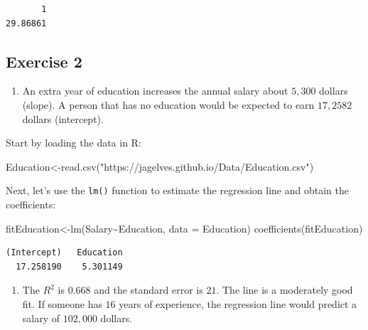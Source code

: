 \documentclass[
  letterpaper,
  DIV=11,
  numbers=noendperiod]{scrreprt}
\newenvironment{Shaded}{\begin{snugshade}}{\end{snugshade}}
\newcommand{\AttributeTok}[1]{\textcolor[rgb]{0.40,0.45,0.13}{#1}}
\newcommand{\FunctionTok}[1]{\textcolor[rgb]{0.28,0.35,0.67}{#1}}
\newcommand{\NormalTok}[1]{\textcolor[rgb]{0.00,0.23,0.31}{#1}}
\newcommand{\OtherTok}[1]{\textcolor[rgb]{0.00,0.23,0.31}{#1}}
\newcommand{\SpecialCharTok}[1]{\textcolor[rgb]{0.37,0.37,0.37}{#1}}
\newcommand{\StringTok}[1]{\textcolor[rgb]{0.13,0.47,0.30}{#1}}
\providecommand{\tightlist}{%
  \setlength{\itemsep}{0pt}\setlength{\parskip}{0pt}}\usepackage{longtable,booktabs,array}
\begin{document}
\begin{verbatim}
       1 
29.86861 
\end{verbatim}

\hypertarget{exercise-2-13}{%
\subsection*{Exercise 2}\label{exercise-2-13}}

\begin{enumerate}
\def\labelenumi{\arabic{enumi}.}
\tightlist
\item
  An extra year of education increases the annual salary about \(5,300\)
  dollars (slope). A person that has no education would be expected to
  earn \(17,2582\) dollars (intercept).
\end{enumerate}

Start by loading the data in R:

\begin{Shaded}
\begin{Highlighting}[numbers=left,,]
\NormalTok{Education}\OtherTok{\textless{}{-}}\FunctionTok{read.csv}\NormalTok{(}\StringTok{"https://jagelves.github.io/Data/Education.csv"}\NormalTok{)}
\end{Highlighting}
\end{Shaded}

Next, let's use the \texttt{lm()} function to estimate the regression
line and obtain the coefficients:

\begin{Shaded}
\begin{Highlighting}[numbers=left,,]
\NormalTok{fitEducation}\OtherTok{\textless{}{-}}\FunctionTok{lm}\NormalTok{(Salary}\SpecialCharTok{\textasciitilde{}}\NormalTok{Education, }\AttributeTok{data =}\NormalTok{ Education)}
\FunctionTok{coefficients}\NormalTok{(fitEducation)}
\end{Highlighting}
\end{Shaded}

\begin{verbatim}
(Intercept)   Education 
  17.258190    5.301149 
\end{verbatim}

\begin{enumerate}
\def\labelenumi{\arabic{enumi}.}
\setcounter{enumi}{1}
\tightlist
\item
  The \(R^2\) is \(0.668\) and the standard error is \(21\). The line is
  a moderately good fit. If someone has \(16\) years of experience, the
  regression line would predict a salary of \(102,000\) dollars.
\end{enumerate}
\end{document}
